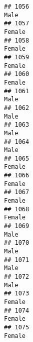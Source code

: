 \documentclass[]{article}
\begin{document}
\begin{verbatim}
## 1056                                                                                                                            Male
## 1057                                                                                                                          Female
## 1058                                                                                                                          Female
## 1059                                                                                                                          Female
## 1060                                                                                                                          Female
## 1061                                                                                                                            Male
## 1062                                                                                                                            Male
## 1063                                                                                                                            Male
## 1064                                                                                                                            Male
## 1065                                                                                                                          Female
## 1066                                                                                                                          Female
## 1067                                                                                                                          Female
## 1068                                                                                                                          Female
## 1069                                                                                                                            Male
## 1070                                                                                                                            Male
## 1071                                                                                                                            Male
## 1072                                                                                                                            Male
## 1073                                                                                                                          Female
## 1074                                                                                                                          Female
## 1075                                                                                                                          Female

\end{verbatim}
\end{document}
